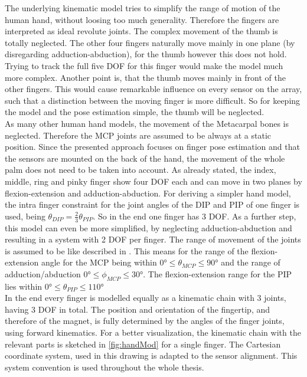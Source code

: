 The underlying kinematic model tries to simplify the range of motion of the human hand, without loosing too much generality. Therefore the fingers are interpreted as ideal revolute joints. The complex movement of the thumb is totally neglected. The other four fingers naturally move mainly in one plane (by disregarding adduction-abduction), for the thumb however this does not hold. Trying to track the full five \ac{DOF} for this finger would make the model much more complex. Another point is, that the thumb moves mainly \grqq in front \grqq of the other fingers. This would cause remarkable influence on every sensor on the array, such that a distinction between the moving finger is more difficult. So for keeping the model and the pose estimation simple, the thumb will be neglected.\\
As many other human hand models, the movement of the Metacarpal bones is neglected. Therefore the \ac{MCP} joints are assumed to be always at a static position. Since the presented approach focuses on finger pose estimation and that the sensors are mounted on the back of the hand, the movement of the whole palm does not need to be taken into account. As already stated, the index, middle, ring and pinky finger show four \ac{DOF} each and can move in two planes by flexion-extension and adduction-abduction. For deriving a simpler hand model, the intra finger constraint for the joint angles of the \ac{DIP} and \ac{PIP} of one finger is used, being $ \theta_{DIP} = \frac{2}{3} \theta_{PIP} $. So in the end one finger has 3 \ac{DOF}. As a further step, this model can even be more simplified, by neglecting adduction-abduction and resulting in a system with 2 \ac{DOF} per finger. The range of movement of the joints is assumed to be like described in \cite{lin2000modeling}. This means for the range of the flexion-extension angle for the \ac{MCP} being within $ \ang{0} \leq \theta_{MCP} \leq \ang{90} $ and the range of adduction/abduction $ \ang{0} \leq \phi_{MCP} \leq \ang{30} $. The flexion-extension range for the \ac{PIP} lies within $ \ang{0} \leq \theta_{PIP} \leq \ang{110} $\\
In the end every finger is modelled equally as a kinematic chain with 3 joints, having 3 \ac{DOF} in total. The position and orientation of the fingertip, and therefore of the magnet, is fully determined by the angles of the finger joints, using forward kinematics. For a better visualization, the kinematic chain with the relevant parts is sketched in \ref{fig:handMod} for a single finger. The Cartesian coordinate system, used in this drawing is adapted to the sensor alignment. This system convention is used throughout the whole thesis.
